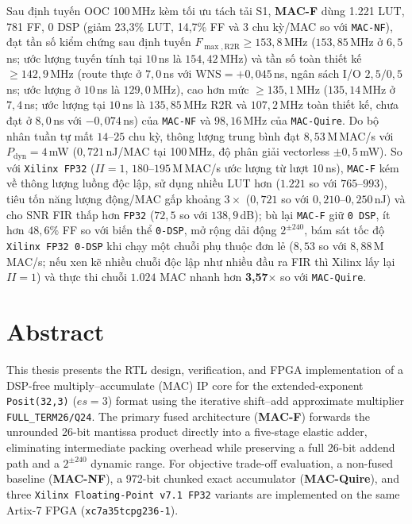 Sau định tuyến OOC 100\,MHz kèm tối ưu tách tải S1, \textbf{MAC-F} dùng 1.221 LUT,
781 FF, 0 DSP (giảm 23,3\% LUT, 14,7\% FF và 3 chu kỳ/MAC so với \texttt{MAC-NF}),
đạt tần số kiểm chứng sau định tuyến $F_{\max,\mathrm{R2R}} \ge 153{,}8$\,MHz
($153{,}85$\,MHz ở $6{,}5$\,ns; ước lượng tuyến tính tại $10$\,ns là $154{,}42$\,MHz)
và tần số toàn thiết kế $\ge 142{,}9$\,MHz (route thực ở $7{,}0$\,ns với
$\mathrm{WNS}=+0{,}045$\,ns, ngân sách I/O $2{,}5/0{,}5$\,ns; ước lượng ở $10$\,ns là
$129{,}0$\,MHz), cao hơn mức $\ge 135{,}1$\,MHz ($135{,}14$\,MHz ở $7{,}4$\,ns;
ước lượng tại $10$\,ns là $135{,}85$\,MHz R2R và $107{,}2$\,MHz toàn thiết kế,
chưa đạt ở $8{,}0$\,ns với $-0{,}074$\,ns) của \texttt{MAC-NF} và $98{,}16$\,MHz của
\texttt{MAC-Quire}. Do bộ nhân tuần tự mất $14\text{--}25$ chu kỳ, thông lượng
trung bình đạt $8{,}53$\,M\,MAC/s với $P_{\mathrm{dyn}} = 4$\,mW ($0{,}721$\,nJ/MAC
tại 100\,MHz, độ phân giải vectorless $\pm 0{,}5$\,mW). So với \texttt{Xilinx FP32}
($II=1$, $180\text{--}195$\,M\,MAC/s ước lượng từ lượt $10$\,ns), \texttt{MAC-F} kém
về thông lượng luồng độc lập, sử dụng nhiều LUT hơn ($1.221$ so với $765\text{--}993$),
tiêu tốn năng lượng động/MAC gấp khoảng $3\times$ ($0{,}721$ so với
$0{,}210\text{--}0{,}250$\,nJ) và cho SNR FIR thấp hơn \texttt{FP32} ($72{,}5$ so với
$138{,}9$\,dB); bù lại \texttt{MAC-F} giữ \texttt{0 DSP}, ít hơn $48{,}6\%$ FF so với
biến thể \texttt{0-DSP}, mở rộng dải động $2^{\pm 240}$, bám sát tốc độ
\texttt{Xilinx FP32 0-DSP} khi chạy một chuỗi phụ thuộc đơn lẻ ($8{,}53$ so với
$8{,}88$\,M\,MAC/s; nếu xen kẽ nhiều chuỗi độc lập như nhiều đầu ra FIR thì Xilinx
lấy lại $II=1$) và thực thi chuỗi $1.024$ MAC nhanh hơn \textbf{3,57$\times$} so với
\texttt{MAC-Quire}.

\clearpage
\chapter*{Abstract}
This thesis presents the RTL design, verification, and FPGA implementation of a
DSP-free multiply--accumulate (MAC) IP core for the extended-exponent
\texttt{Posit(32,3)} ($es=3$) format using the iterative shift--add approximate
multiplier \texttt{FULL\_TERM26/Q24}. The primary fused architecture (\textbf{MAC-F})
forwards the unrounded 26-bit mantissa product directly into a five-stage elastic
adder, eliminating intermediate packing overhead while preserving a full 26-bit
addend path and a $2^{\pm 240}$ dynamic range. For objective trade-off evaluation,
a non-fused baseline (\textbf{MAC-NF}), a 972-bit chunked exact accumulator
(\textbf{MAC-Quire}), and three \texttt{Xilinx Floating-Point v7.1 FP32} variants
are implemented on the same Artix-7 FPGA (\texttt{xc7a35tcpg236-1}).

